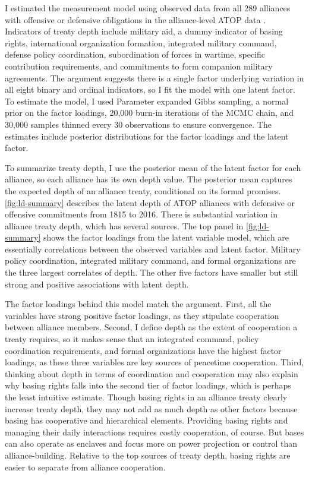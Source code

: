 \documentclass[12pt]{article}
\begin{document}
I estimated the measurement model using observed data from all 289 alliances with offensive or defensive obligations in the alliance-level ATOP data \citep{Leedsetal2002}. 
Indicators of treaty depth include military aid, a dummy indicator of basing rights, international organization formation, integrated military command, defense policy coordination, subordination of forces in wartime, specific contribution requirements, and commitments to form companion military agreements.
The argument suggests there is a single factor underlying variation in all eight binary and ordinal indicators, so I fit the model with one latent factor. 
To estimate the model, I used Parameter expanded Gibbs sampling, a normal prior on the factor loadings, 20,000 burn-in iterations of the MCMC chain, and 30,000 samples thinned every 30 observations to ensure convergence. 
The estimates include posterior distributions for the factor loadings and the latent factor. 


To summarize treaty depth, I use the posterior mean of the latent factor for each alliance, so each alliance has its own depth value.
The posterior mean captures the expected depth of an alliance treaty, conditional on its formal promises. 
\autoref{fig:ld-summary} describes the latent depth of ATOP alliances with defensive or offensive commitments from 1815 to 2016.
There is substantial variation in alliance treaty depth, which has several sources. 
The top panel in \autoref{fig:ld-summary} shows the factor loadings from the latent variable model, which are essentially correlations between the observed variables and latent factor. 
Military policy coordination, integrated military command, and formal organizations are the three largest correlates of depth. 
The other five factors have smaller but still strong and positive associations with latent depth. 


The factor loadings behind this model match the argument. 
First, all the variables have strong positive factor loadings, as they stipulate cooperation between alliance members. 
Second, I define depth as the extent of cooperation a treaty requires, so it makes sense that an integrated command, policy coordination requirements, and formal organizations have the highest factor loadings, as these three variables are key sources of peacetime cooperation. 
Third, thinking about depth in terms of coordination and cooperation may also explain why basing rights falls into the second tier of factor loadings, which is perhaps the least intuitive estimate. 
Though basing rights in an alliance treaty clearly increase treaty depth, they may not add as much depth as other factors because basing has cooperative and hierarchical elements. 
Providing basing rights and managing their daily interactions requires costly cooperation, of course. 
But bases can also operate as enclaves and focus more on power projection or control than alliance-building.  
Relative to the top sources of treaty depth, basing rights are easier to separate from alliance cooperation. 
\end{document}
